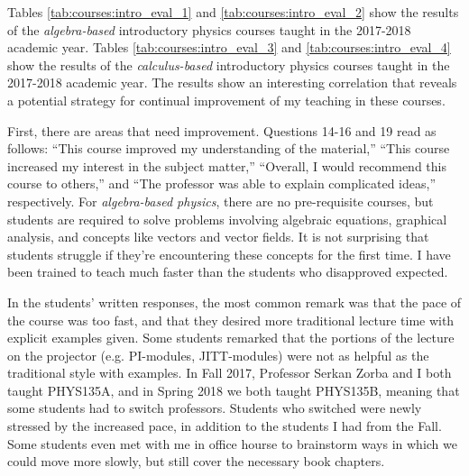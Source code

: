 \documentclass[../../main.tex]{subfiles}
\begin{document}
Tables \ref{tab:courses:intro_eval_1} and \ref{tab:courses:intro_eval_2} show the results of the \textit{algebra-based} introductory physics courses taught in the 2017-2018 academic year.  Tables \ref{tab:courses:intro_eval_3} and \ref{tab:courses:intro_eval_4} show the results of the \textit{calculus-based} introductory physics courses taught in the 2017-2018 academic year.  The results show an interesting correlation that reveals a potential strategy for continual improvement of my teaching in these courses. \\ \hspace{0.1cm}

First, there are areas that need improvement.  Questions 14-16 and 19 read as follows: ``This course improved my understanding of the material,'' ``This course increased my interest in the subject matter,'' ``Overall, I would recommend this course to others,'' and ``The professor was able to explain complicated ideas,'' respectively.  For \textit{algebra-based physics}, there are no pre-requisite courses, but students are required to solve problems involving algebraic equations, graphical analysis, and concepts like vectors and vector fields.  It is not surprising that students struggle if they're encountering these concepts for the first time.  I have been trained to teach much faster than the students who disapproved expected.  \\ \hspace{0.1cm}

In the students' written responses, the most common remark was that the pace of the course was too fast, and that they desired more traditional lecture time with explicit examples given.  Some students remarked that the portions of the lecture on the projector (e.g. PI-modules, JITT-modules) were not as helpful as the traditional style with examples.  In Fall 2017, Professor Serkan Zorba and I both taught PHYS135A, and in Spring 2018 we both taught PHYS135B, meaning that some students had to switch professors.  Students who switched were newly stressed by the increased pace, in addition to the students I had from the Fall.  Some students even met with me in office hourse to brainstorm ways in which we could move more slowly, but still cover the necessary book chapters. \\ \hspace{0.1cm}
\end{document}
